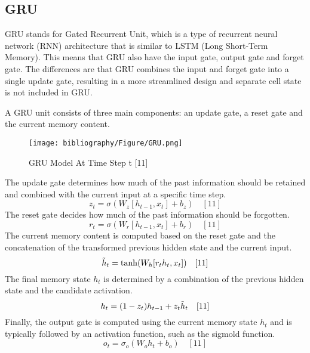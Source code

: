 \documentclass{ieeeojies}
\begin{document}
\subsection{GRU}
GRU stands for Gated Recurrent Unit, which is a type of recurrent neural network (RNN) architecture that is similar to LSTM (Long Short-Term Memory). This means that GRU also have the input gate, output gate and forget gate. The differences are that GRU combines the input and forget gate into a single update gate, resulting in a more streamlined design and separate cell state is not included in GRU.

A GRU unit consists of three main components: an update gate, a reset gate and the current memory content.

\begin{figure}[H]
  \centering
  \begin{minipage}{0.8\linewidth}
    \centering
    \texttt{[image: bibliography/Figure/GRU.png]}
    \caption{GRU Model At Time Step t [11]}
    \label{fig10}
  \end{minipage}
\end{figure}

The update gate determines how much of the past information should be retained and combined with the current input at a specific time step.
\[z_t = \sigma(W_z[h_{t-1},x_t] + b_z)\quad[11]\]
The reset gate decides how much of the past information should be forgotten.
\[r_t = \sigma(W_r[h_{t-1},x_t] + b_r)\quad[11]\]
The current memory content is computed based on the reset gate and the concatenation of the transformed previous hidden state and the current input.
\[\Tilde{h}_t = \tanh(W_h[r_{t}h_{t},x_t])\quad[11]\]
The final memory state $h_t$ is determined by a combination of the previous hidden state and the candidate activation.
\[h_t = (1 - z_t)h_{t-1} + z_{t}\Tilde{h}_t\quad[11]\]
Finally, the output gate is computed using the current memory state $h_t$ and is typically followed by an activation function, such as the sigmold function.
\[o_t = \sigma_o(W_{o}h_t + b_o)\quad[11]\]
\end{document}
